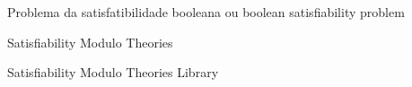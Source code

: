 \item [SAT] Problema da satisfatibilidade booleana ou boolean satisfiability problem
\item [SMT] Satisfiability Modulo Theories
\item [SMT-LIB] Satisfiability Modulo Theories Library